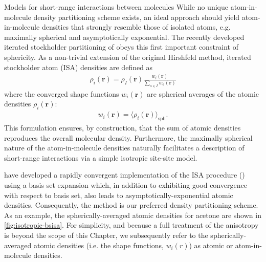 \begin{subsection}{Models for short-range interactions between molecules}
While no unique atom-in-molecule density partitioning scheme exists, an ideal approach
should yield atom-in-molecule densities that strongly resemble those of
isolated atoms, e.g. maximally spherical and asymptotically
exponential.\cite{Yu2011, Levy1984, Misquitta2014, kitaigorodsky2012molecular} 
The recently developed iterated stockholder partitioning of 
\citeauthor{Lillestolen2008} 
obeys this first important constraint of sphericity. 
\cite{Lillestolen2008,Lillestolen2009}
As a non-trivial extension of the original Hirshfeld method,
\cite{Hirshfeld1977}
iterated stockholder atom (ISA) densities are defined as
%
\begin{align}
\rho_i(\mathbf{r}) = \rho_I(\mathbf{r}) 
\frac{ w_i(\mathbf{r}) }{ \sum \limits_{a \in I} w_a(\mathbf{r}) }
\end{align}
%
where the converged shape functions $w_i(\mathbf{r})$ are spherical averages of the
atomic densities $\rho_i(\mathbf{r})$:
%
\begin{align}
w_i(\mathbf{r}) = \langle \rho_i(\mathbf{r}) \rangle_{\text{sph}}.
\end{align}
This formulation ensures, by construction, that the sum of atomic densities
reproduces the overall molecular density. Furthermore, the maximally spherical nature
of the atom-in-molecule densities naturally facilitates a description of short-range
interactions via a simple isotropic site-site model.

\citeauthor{Misquitta2014} have developed a rapidly convergent
implementation of the ISA procedure (\bsisa\cite{Misquitta2014}) using a basis set expansion
which, in addition to exhibiting good convergence with respect to basis set,
also leads to asymptotically-exponential atomic densities.
Consequently, the \bsisa method is our preferred density partitioning scheme.
%
As an example, the spherically-averaged atomic densities for acetone are shown in
\cref{fig:isotropic-bsisa}. For simplicity, and because a full treatment
of the anisotropy is beyond the scope of this Chapter, we subsequently refer to
the spherically-averaged atomic densities (i.e. the shape functions,
$w_i(r)$) as atomic or atom-in-molecule densities.


\end{subsection}
